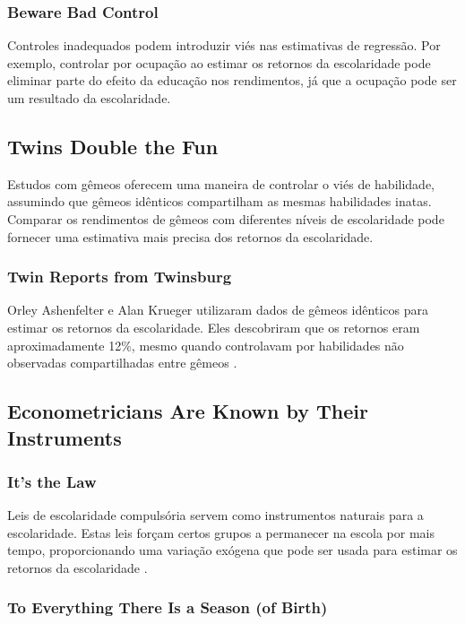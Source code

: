 \documentclass[a4paper,12pt]{article}[abntex2]
\begin{document}
\subsubsection*{Beware Bad Control}

Controles inadequados podem introduzir viés nas estimativas de regressão. Por exemplo, controlar por ocupação ao estimar os retornos da escolaridade pode eliminar parte do efeito da educação nos rendimentos, já que a ocupação pode ser um resultado da escolaridade.

\subsection{Twins Double the Fun}

Estudos com gêmeos oferecem uma maneira de controlar o viés de habilidade, assumindo que gêmeos idênticos compartilham as mesmas habilidades inatas. Comparar os rendimentos de gêmeos com diferentes níveis de escolaridade pode fornecer uma estimativa mais precisa dos retornos da escolaridade.

\subsubsection*{Twin Reports from Twinsburg}

Orley Ashenfelter e Alan Krueger utilizaram dados de gêmeos idênticos para estimar os retornos da escolaridade. Eles descobriram que os retornos eram aproximadamente 12\%, mesmo quando controlavam por habilidades não observadas compartilhadas entre gêmeos  .

\subsection{Econometricians Are Known by Their Instruments}

\subsubsection*{It’s the Law}

Leis de escolaridade compulsória servem como instrumentos naturais para a escolaridade. Estas leis forçam certos grupos a permanecer na escola por mais tempo, proporcionando uma variação exógena que pode ser usada para estimar os retornos da escolaridade .

\subsubsection*{To Everything There Is a Season (of Birth)}
\end{document}
